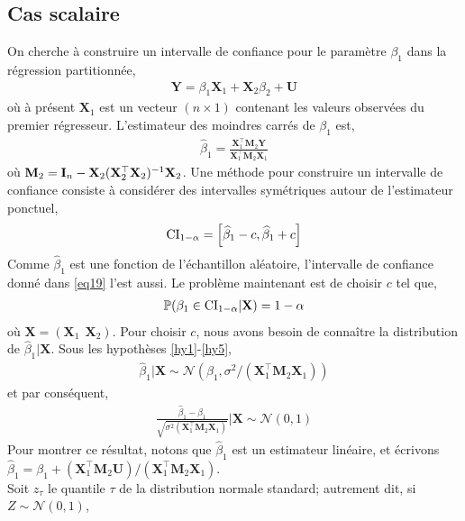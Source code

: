 \subsection{Cas scalaire}
On cherche à construire un intervalle de confiance pour le paramètre $\beta_1$ dans la régression partitionnée,
\begin{align*}
\mathbf{Y} = \beta_1\mathbf{X}_1+\mathbf{X}_2\beta_2 + \mathbf{U}
\end{align*}
où à présent $\mathbf{X}_1$ est un vecteur $(n\times 1)$ contenant les valeurs observées du premier régresseur. L'estimateur des moindres carrés de $\beta_1$ est,
\begin{align*}
\widehat{\beta}_1 = \frac{\mathbf{X}_1^\top\mathbf{M}_2\mathbf{Y}}{\mathbf{X}_1^\top\mathbf{M}_2\mathbf{X}_1}
\end{align*}
où $\mathbf{M}_2 = \mathbf{I}_n - \mathbf{X}_2(\mathbf{X}_2^\top\mathbf{X}_2)^{-1}\mathbf{X}_2$. Une méthode pour construire un intervalle de confiance consiste à considérer des intervalles symétriques autour de l'estimateur ponctuel,
\begin{align}
\mathrm{CI}_{1-\alpha} = \left[\widehat{\beta}_1- c,  \widehat{\beta}_1+c\right]
\label{eq19}
\end{align}
Comme $\widehat{\beta}_1$ est une fonction de l'échantillon aléatoire, l'intervalle de confiance donné dans \eqref{eq19} l'est aussi. Le problème maintenant est de choisir $c$ tel que,
\begin{align*}
{\mathbb{P}}(\beta_1 \in \mathrm{CI}_{1-\alpha}| \mathbf{X}) = 1-\alpha
\end{align*}
où $\mathbf{X} = (\mathbf{X}_1 \ \ \mathbf{X}_2)$. Pour choisir $c$, nous avons besoin de connaître la distribution de $\widehat{\beta}_1|\mathbf{X}$. Sous les hypothèses \ref{hy1}-\ref{hy5},
\begin{align*}
\widehat{\beta}_1|\mathbf{X} \sim \mathcal{N}\left(\beta_1, \sigma^2/(\mathbf{X}_1^\top\mathbf{M}_2\mathbf{X}_1)\right)
\end{align*}
et par conséquent,
\begin{align}
\frac{\widehat{\beta}_1-\beta_1 }{\sqrt{\sigma^2
(\mathbf{X}_1^\top\mathbf{M}_2\mathbf{X}_1)}} | \mathbf{X} \sim \mathcal{N}(0, 1)
\label{eq20}
\end{align}
Pour montrer ce résultat, notons que $\widehat{\beta}_1$ est un estimateur linéaire, et écrivons $\widehat{\beta}_1 = \beta_1 + (\mathbf{X}_1^\top\mathbf{M}_2\mathbf{U}) / (\mathbf{X}_1^\top\mathbf{M}_2\mathbf{X}_1)$.\\
Soit $z_\tau$ le quantile $\tau$ de la distribution normale standard; autrement dit, si $Z\sim \mathcal{N}(0,1)$,
